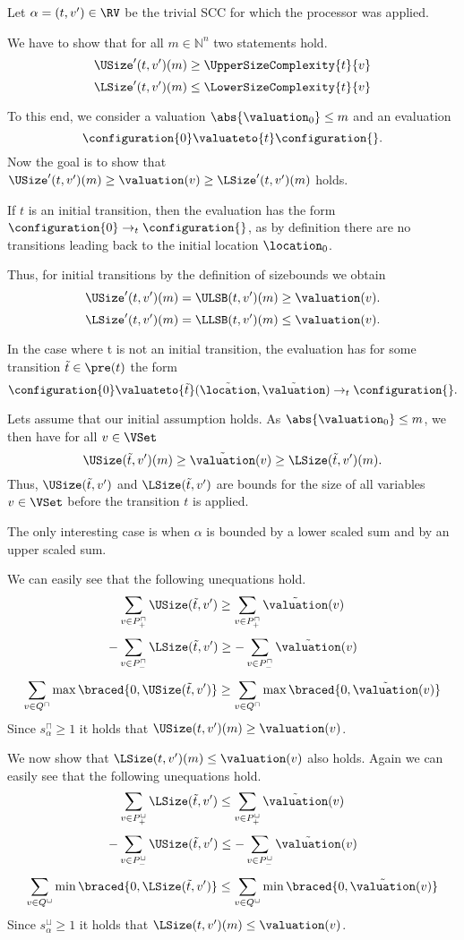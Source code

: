 Let $\alpha = (t, v') \in \RV$ be the trivial SCC for which the processor was applied.

We have to show that for all $m \in \mathbb{N}^n$ two statements hold.
\[ \USize'(t, v')(m) \geq \UpperSizeComplexity{t}{v} \]
\[ \LSize'(t, v')(m) \leq \LowerSizeComplexity{t}{v} \]

To this end, we consider a valuation $\abs{\valuation_0} \leq m$ and an evaluation
\[ \configuration{0} \valuateto{t} \configuration{} . \]
Now the goal is to show that $\USize'(t, v')(m) \geq \valuation(v) \geq \LSize'(t, v')(m)$ holds.

If $t$ is an initial transition, then the evaluation has the form $\configuration{0} \rightarrow_t \configuration{}$, as by definition there are no transitions leading back to the initial location $\location_0$.

Thus, for initial transitions by the definition of sizebounds we obtain
\[ \USize'(t, v')(m) = \ULSB(t, v')(m) \geq \valuation(v). \]
\[ \LSize'(t, v')(m) = \LLSB(t, v')(m) \leq \valuation(v). \]

In the case where t is not an initial transition, the evaluation has for some transition $\tilde{t} \in \pre(t)$ the form
\[ \configuration{0}  \valuateto{\tilde{t}} (\tilde{\location}, \tilde{\valuation}) \rightarrow_t \configuration{}. \]

Lets assume that our initial assumption holds.
As $\abs{\valuation_0} \leq m$, we then have for all $v \in \VSet$
\[ \USize(\tilde{t}, v')(m) \geq \tilde{\valuation}(v) \geq \LSize(\tilde{t}, v')(m). \]
Thus, $\USize(\tilde{t}, v')$ and $\LSize(\tilde{t}, v')$ are bounds for the size of all variables $v \in \VSet$ before the transition $t$ is applied.

The only interesting case is when $\alpha$ is bounded by a lower scaled sum and by an upper scaled sum.

We can easily see that the following unequations hold.
\[ \sum_{v \in P_+^\sqcap} \USize(\tilde{t}, v') \geq \sum_{v \in P_+^\sqcap} \tilde{\valuation}(v) \]
\[ - \sum_{v \in P_-^\sqcap} \LSize(\tilde{t}, v') \geq - \sum_{v \in P_-^\sqcap} \tilde{\valuation}(v) \]
\[ \sum_{v \in Q^\sqcap} \max \braced{0,\USize(\tilde{t}, v')} \geq \sum_{v \in Q^\sqcap} \max \braced{0,\tilde{\valuation}(v)} \]
Since $s^\sqcap_\alpha \geq 1$ it holds that $\USize(t, v')(m) \geq \valuation(v)$.

We now show that $\LSize(t, v')(m) \leq \valuation(v)$ also holds.
Again we can easily see that the following unequations hold.
\[ \sum_{v \in P_+^\sqcup} \LSize(\tilde{t}, v') \leq \sum_{v \in P_+^\sqcup} \tilde{\valuation}(v) \]
\[ - \sum_{v \in P_-^\sqcup} \USize(\tilde{t}, v') \leq - \sum_{v \in P_-^\sqcup} \tilde{\valuation}(v) \]
\[ \sum_{v \in Q^\sqcup} \min \braced{0,\LSize(\tilde{t}, v')} \leq \sum_{v \in Q^\sqcup} \min \braced{0,\tilde{\valuation}(v)} \]
Since $s^\sqcup_\alpha \geq 1$ it holds that $\LSize(t, v')(m) \leq \valuation(v)$.
